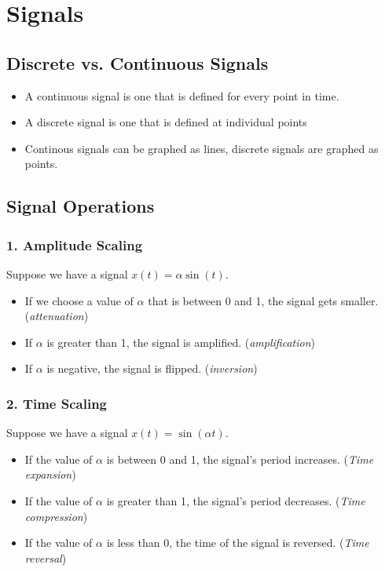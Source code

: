 \documentclass[10pt]{article}
\begin{document}
\section*{Signals}
\subsection*{Discrete vs. Continuous Signals}
\begin{itemize}
    \item A continuous signal is one that is defined for every point in time.
    \item A discrete signal is one that is defined at individual points
    \item Continous signals can be graphed as lines, discrete signals are graphed as points.
\end{itemize}
\subsection*{Signal Operations}
\subsubsection*{1. Amplitude Scaling}
Suppose we have a signal $x(t) = \alpha\sin(t)$.
\begin{itemize}
    \item If we choose a value of $\alpha$ that is between 0 and 1, the signal gets smaller. (\textit{attenuation})
    \item If $\alpha$ is greater than 1, the signal is amplified. (\textit{amplification})
    \item If $\alpha$ is negative, the signal is flipped.  (\textit{inversion})
\end{itemize}
\subsubsection*{2. Time Scaling}
Suppose we have a signal $x(t) = \sin(\alpha t)$.
\begin{itemize}
    \item If the value of $\alpha$ is between 0 and 1, the signal's period increases.  (\textit{Time expansion})
    \item If the value of $\alpha$ is greater than 1, the signal's period decreases.  (\textit{Time compression})
    \item If the value of $\alpha$ is less than 0, the time of the signal is reversed.  (\textit{Time reversal})
\end{itemize}
\end{document}
